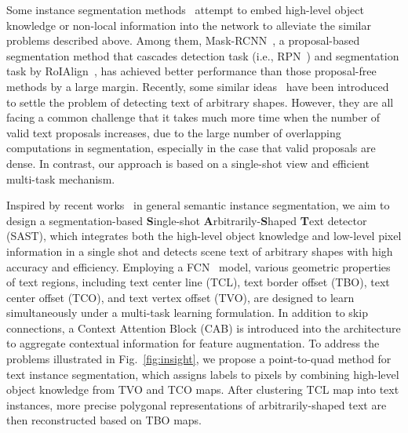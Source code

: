 \documentclass[sigconf]{acmart}
\begin{document}
Some instance segmentation methods~\cite{zheng2015conditional,he2017mask,fathi2017semantic} attempt to embed high-level object knowledge or non-local information into the network to alleviate the similar problems described above. Among them, Mask-RCNN~\cite{he2017mask}, a proposal-based segmentation method that cascades detection task (i.e., RPN~\cite{ren2015faster}) and segmentation task by RoIAlign~\cite{he2017mask}, has achieved better performance than those proposal-free methods by a large margin. Recently, some similar ideas~\cite{yao2018mask, huang2019mask, yang2018inceptext} have been introduced to settle the problem of detecting text of arbitrary shapes. However, they are all facing a common challenge that it takes much more time when the number of valid text proposals increases, due to the large number of overlapping computations in segmentation, especially in the case that valid proposals are dense. In contrast, our approach is based on a single-shot view and efficient multi-task mechanism.



Inspired by recent works~\cite{kirillov2017instancecut, uhrig2018box2pix, liu2018affinity} in general semantic instance segmentation, 
we aim to design a segmentation-based \textbf{S}ingle-shot \textbf{A}rbitrarily-\textbf{S}haped  \textbf{T}ext detector (SAST), which integrates both the high-level object knowledge and low-level pixel information in a single shot and detects scene text of arbitrary shapes with high accuracy and efficiency.
Employing a FCN~\cite{milletari2016v} model, various geometric properties of text regions, including text center line (TCL), text border offset (TBO), text center offset (TCO), and text vertex offset (TVO), are designed to learn simultaneously under a multi-task learning formulation. In addition to skip connections, a Context Attention Block (CAB) is introduced into the architecture to aggregate contextual information for feature augmentation.
To address the problems illustrated in Fig.~\ref{fig:insight}, we propose a point-to-quad method for text instance segmentation, which assigns labels to pixels by combining high-level object knowledge from TVO and TCO maps. After clustering TCL map into text instances, more precise polygonal representations of arbitrarily-shaped text are then reconstructed based on TBO maps. 
\end{document}
